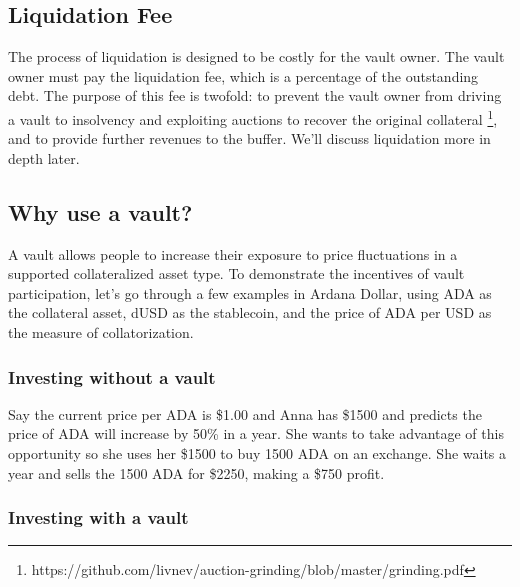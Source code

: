 \documentclass[12pt]{article}
\begin{document}
\subsection{Liquidation Fee}

The process of liquidation is designed to be costly for the vault owner. The vault owner must pay the liquidation fee, which is a percentage of the outstanding debt. The purpose of this fee is twofold: to prevent the vault owner from driving a vault to insolvency and exploiting auctions to recover the original collateral \footnote{https://github.com/livnev/auction-grinding/blob/master/grinding.pdf}, and to provide further revenues to the buffer. We'll discuss liquidation more in depth later.

\subsection{Why use a vault?}

A vault allows people to increase their exposure to price fluctuations in a supported collateralized asset type. To demonstrate the incentives of vault participation, let's go through a few examples in Ardana Dollar, using ADA as the collateral asset, dUSD as the stablecoin, and the price of ADA per USD as the measure of collatorization.

	\subsubsection{Investing without a vault}

Say the current price per ADA is \$1.00 and Anna has \$1500 and predicts the price of ADA will increase by 50\% in a year. She wants to take advantage of this opportunity so she uses her \$1500 to buy 1500 ADA on an exchange. She waits a year and sells the 1500 ADA for \$2250, making a \$750 profit.

	\subsubsection{Investing with a vault}
\end{document}
